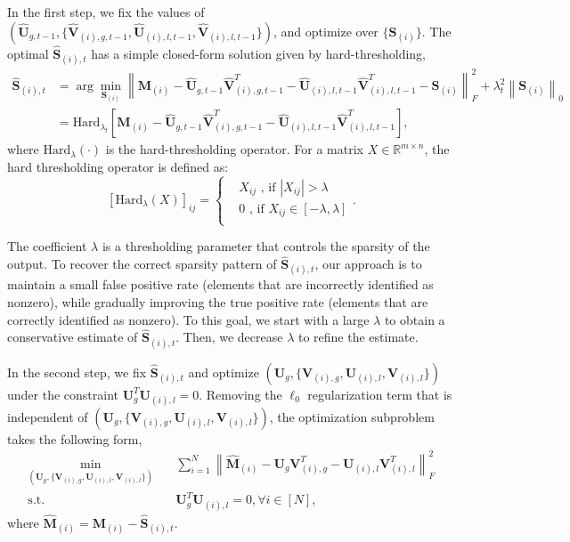 \documentclass[twoside,11pt]{article}
\newcommand{\abs}[1]{\left\vert #1\right\vert}
\newcommand{\norm}[1]{\left\lVert#1\right\rVert}
\newcommand{\matM}{\mathbf{M}}
\newcommand{\matS}{\mathbf{S}}
\newcommand{\matU}{\mathbf{U}}
\newcommand{\matV}{\mathbf{V}}
\newcommand{\hmatM}{\hat{\mathbf{M}}}
\newcommand{\hmatS}{\hat{\mathbf{S}}}
\newcommand{\hmatU}{\hat{\mathbf{U}}}
\newcommand{\hmatV}{\hat{\mathbf{V}}}
\begin{document}
In the first step, we fix the values of $\left(\hmatU_{g,t-1},\{\hmatV_{(i),g,t-1},\hmatU_{(i),l,t-1},\hmatV_{(i),l,t-1}\}\right)$, and optimize over $\{\matS_{(i)}\}$. The optimal $\hmatS_{(i),t}$ has a simple closed-form solution given by hard-thresholding,
$$
\begin{aligned}
\hmatS_{(i),t}&=\arg\min_{\matS_{(i)}}\norm{\matM_{(i)}-\hmatU_{g,t-1}\hmatV_{(i),g,t-1}^T-\hmatU_{(i),l,t-1}\hmatV_{(i),l,t-1}^T-\matS_{(i)}}_F^2+\lambda_t^2\norm{\matS_{(i)}}_0\\
&=\text{Hard}_{\lambda_t}\left[\matM_{(i)}-\hmatU_{g,t-1}\hmatV_{(i),g,t-1}^T-\hmatU_{(i),l,t-1}\hmatV_{(i),l,t-1}^T\right],
\end{aligned}
$$
where $\text{Hard}_{\lambda}(\cdot)$ is the hard-thresholding operator. For a matrix $X\in \mathbb{R}^{m\times n}$, the hard thresholding operator is defined as:
\begin{equation}
\label{eqn:defofsoftthresholding}
\left[\text{Hard}_{\lambda}\left(X\right)\right]_{ij} = \left\{
\begin{aligned}
& X_{ij} \text{ ,  if  }\abs{X_{ij}} > \lambda\\
& 0 \text{ ,  if  }X_{ij}\in [-\lambda,\lambda]\\
\end{aligned}\right. .
\end{equation}

The coefficient $\lambda$ is a thresholding parameter that controls the sparsity of the output. To recover the correct sparsity pattern of $\hmatS_{(i),t}$, our approach is to maintain a small false positive rate (elements that are incorrectly identified as nonzero), while gradually improving the true positive rate (elements that are correctly identified as nonzero). To this goal, we start with a large $\lambda$ to obtain a conservative estimate of $\hmatS_{(i),t}$. Then, we decrease $\lambda$ to refine the estimate.

In the second step, we fix $\hmatS_{(i),t}$ and optimize $\left(\matU_g,\{\matV_{(i),g},\matU_{(i),l},\matV_{(i),l}\}\right)$ under the constraint $\matU_g^T\matU_{(i),l}=0$. Removing the $\ell_0$ regularization term that is independent of $\left(\matU_g,\{\matV_{(i),g},\matU_{(i),l},\matV_{(i),l}\}\right)$, the optimization subproblem takes the following form,
\begin{equation}
\label{eqn:subproblemobj}
\begin{aligned}
\min_{\left(\matU_g,\{\matV_{(i),g},\matU_{(i),l},\matV_{(i),l}\}\right)} &\quad \sum_{i=1}^N\norm{\hmatM_{(i)}-\matU_g\matV_{(i),g}^T-\matU_{(i),l}\matV_{(i),l}^T}_F^2 \\
\text{s.t.}& \quad  \matU_g^T\matU_{(i),l}=0, \forall i\in [N],
\end{aligned}
\end{equation}
where $\hmatM_{(i)} = \matM_{(i)}-\hmatS_{(i),t}$.
\end{document}
